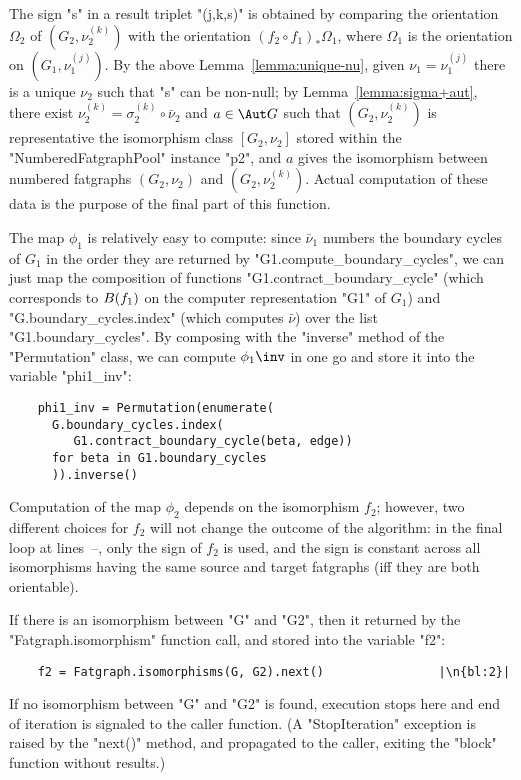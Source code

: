 The sign "s" in a result triplet "(j,k,s)" is obtained by comparing
the orientation $\Omega_2$ of $(G_2, \nu_2^{(k)})$ with the
orientation ${(f_2 \circ f_1)}_* \Omega_1$, where $\Omega_1$ is the
orientation on $(G_1, \nu_1^{(j)})$.  By the above
Lemma~\ref{lemma:unique-nu}, given $\nu_1 = \nu_1^{(j)}$ there is a
unique $\nu_2$ such that "s" can be non-null; by
Lemma~\ref{lemma:sigma+aut}, there exist $\nu_2^{(k)} = \sigma_2^{(k)}
\circ \bar\nu_2$ and $a \in \Aut G$ such that $(G_2, \nu_2^{(k)})$ is
representative the isomorphism class $[G_2,\nu_2]$ stored within the
"NumberedFatgraphPool" instance "p2", and $a$ gives the isomorphism
between numbered fatgraphs $(G_2,\nu_2)$ and $(G_2, \nu_2^{(k)})$.
Actual computation of these data is the purpose of the final part of
this function.

The map $\phi_1$ is relatively easy to compute: since $\bar\nu_1$
numbers the boundary cycles of $G_1$ in the order they are returned by
"G1.compute_boundary_cycles", we can just map the composition of
functions "G1.contract_boundary_cycle" (which corresponds to
$B(f_1)$ on the computer representation "G1" of $G_1$) and
"G.boundary_cycles.index" (which computes $\bar\nu$) over the list
"G1.boundary_cycles".  By composing with the "inverse" method of the
"Permutation" class, we can compute $\phi_1\inv$ in one go and store
it into the variable "phi1_inv":
\begin{lstlisting}
    phi1_inv = Permutation(enumerate(
      G.boundary_cycles.index(
         G1.contract_boundary_cycle(beta, edge))
      for beta in G1.boundary_cycles
      )).inverse()

\end{lstlisting}
 
Computation of the map $\phi_2$ depends on the isomorphism
$f_2$; however, two different choices for $f_2$ will not change the
outcome of the algorithm: in the final loop at lines~--,
only the sign of $f_2$ is used, and the sign is constant across all
isomorphisms having the same source and target fatgraphs (iff
they are both orientable).

If there is an isomorphism between "G" and "G2", then it returned by
the "Fatgraph.isomorphism" function call, and stored into the variable "f2":
\begin{lstlisting}
    f2 = Fatgraph.isomorphisms(G, G2).next()                |\n{bl:2}|
\end{lstlisting}
If no isomorphism between "G" and "G2" is found, execution stops here
and end of iteration is signaled to the caller function. (A
"StopIteration" exception is raised by the "next()" method, and
propagated to the caller, exiting the "block" function without
results.)

